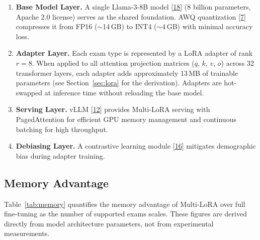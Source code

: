 \documentclass[12pt]{article}
\begin{document}
\begin{enumerate}[leftmargin=*]
    \item \textbf{Base Model Layer.} A single Llama-3-8B model [\hyperlink{ref18}{18}] (8 billion parameters, Apache 2.0 license) serves as the shared foundation. AWQ quantization [\hyperlink{ref7}{7}] compresses it from FP16 ($\sim$14\,GB) to INT4 ($\sim$4\,GB) with minimal accuracy loss.

    \item \textbf{Adapter Layer.} Each exam type is represented by a LoRA adapter of rank $r=8$. When applied to all attention projection matrices ($q$, $k$, $v$, $o$) across 32 transformer layers, each adapter adds approximately 13\,MB of trainable parameters (see Section~\ref{sec:lora} for the derivation). Adapters are hot-swapped at inference time without reloading the base model.

    \item \textbf{Serving Layer.} vLLM [\hyperlink{ref12}{12}] provides Multi-LoRA serving with PagedAttention for efficient GPU memory management and continuous batching for high throughput.

    \item \textbf{Debiasing Layer.} A contrastive learning module [\hyperlink{ref16}{16}] mitigates demographic bias during adapter training.
\end{enumerate}

\subsection{Memory Advantage}

Table~\ref{tab:memory} quantifies the memory advantage of Multi-LoRA over full fine-tuning as the number of supported exams scales. These figures are derived directly from model architecture parameters, not from experimental measurements.
\end{document}
